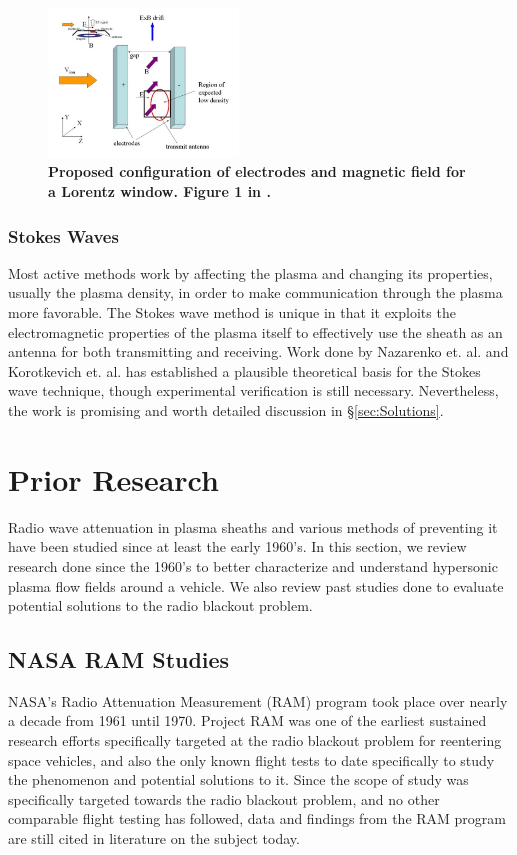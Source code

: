 \documentclass[twocolumn]{article}
\begin{document}
	\begin{figure}[H]
		\centering
			\includegraphics[width=0.45\textwidth]{Images/Kimetal_ExB_config.png}
		\caption{\textbf{Proposed configuration of electrodes and magnetic field for a Lorentz window. Figure 1 in \cite{kim_plasma_2007}.}}
		\label{fig:KimExBConfig}
	\end{figure}
	
	\subsubsection*{Stokes Waves}
	Most active methods work by affecting the plasma and changing its properties, usually the plasma density, in order to make communication through the plasma more favorable.
	The Stokes wave method is unique in that it exploits the electromagnetic properties of the plasma itself to effectively use the sheath as an antenna for both transmitting and receiving.
	Work done by Nazarenko et. al. and Korotkevich et. al. has established a plausible theoretical basis for the Stokes wave technique, though experimental verification is still necessary.\cite{nazarenko_communication_1994}\cite{korotkevich_communication_2007}
	Nevertheless, the work is promising and worth detailed discussion in \S\ref{sec:Solutions}.

	
	
\section{Prior Research} \label{sec:Prior}
	Radio wave attenuation in plasma sheaths and various methods of preventing it have been studied since at least the early 1960's.
	In this section, we review research done since the 1960's to better characterize and understand hypersonic plasma flow fields around a vehicle.
	We also review past studies done to evaluate potential solutions to the radio blackout problem.
	
	\subsection*{NASA RAM Studies}
	NASA's Radio Attenuation Measurement (RAM) program took place over nearly a decade from 1961 until 1970.
	Project RAM was one of the earliest sustained research efforts specifically targeted at the radio blackout problem for reentering space vehicles, and also the only known flight tests to date specifically to study the phenomenon and potential solutions to it.
	Since the scope of study was specifically targeted towards the radio blackout problem, and no other comparable flight testing has followed, data and findings from the RAM program are still cited in literature on the subject today.
	
\end{document}
